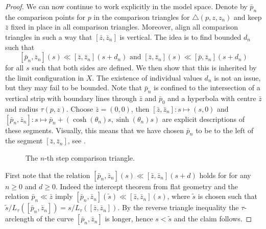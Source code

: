 \documentclass[11pt,reqno]{amsart}
\theoremstyle{definition}
\newcommand{\Cref}[1]{\zcref[S]{#1}}
\theoremstyle{definition}
\theoremstyle{plain}
\theoremstyle{remark}
\newcommand{\bp}{\bar p}
\newcommand{\bz}{\bar z}
\begin{document}
\begin{proof}
We can now continue to work explicitly in the model space. 
Denote by $\bp_n$ the comparison points for $p$ in the comparison triangles for $\triangle(p,z,z_n)$ and keep $\bz$ fixed in place in all comparison triangles. 
Moreover, align all comparison triangles in such a way that $[\bz,\bz_n]$ is vertical. 
The idea is to find bounded $d_n$ such that
\[
[\bp_n,\bz_n](s) \ll [\bz,\bz_n](s+d_n) \text{ and } [\bz,\bz_n](s) \ll [\bp,\bz_n](s+d_n)
\]
for all $s$ such that both sides are defined. 
We then show that this is inherited by the limit configuration in $X$. 
The existence of individual values $d_n$ is not an issue, but they may fail to be bounded.
Note that $\bp_n$ is confined to the intersection of a vertical strip with boundary lines through $\bz$ and $\bp_0$ and a hyperbola with centre $\bz$ and radius $\tau(p,z)$. Choose $\bz=(0,0)$, then $[\bz,\bz_n]: s \mapsto (s,0)$ and $[\bp_n,\bz_n]: s \mapsto \bp_n + (\cosh(\theta_n)s,\sinh(\theta_n)s)$ are explicit descriptions of these segments. 
Visually, this means that we have chosen $\bp_n$ to be to the left of the segment $[\bz,\bz_n]$, see \Cref{fig: parallel ray comparison configuration}.
\begin{figure}
\begin{center}
\end{center}
\caption{The $n$-th step comparison triangle.}
\label{fig: parallel ray comparison configuration}
\end{figure}

First note that the relation $[\bar p_n,\bar z_n](s)\ll[\bar z,\bar z_n](s+d)$ holds for for any $n\geq 0$ and $d\geq 0$. Indeed the intercept theorem from flat geometry and the relation $\bar p_n\ll\bar z$ imply $[\bar p_n,\bar z_n](\tilde s)\ll[\bar z,\bar z_n](s)$, where $\tilde s$ is chosen such that $\tilde s/L_\tau([\bar p_n,\bar z_n])=s/L_\tau([\bar z,\bar z_n])$. By the reverse triangle inequality the $\tau$-arclength of the curve $[\bar p_n,\bar z_n]$ is longer, hence $s<\tilde s$ and the claim follows. 


\end{proof}
\end{document}
